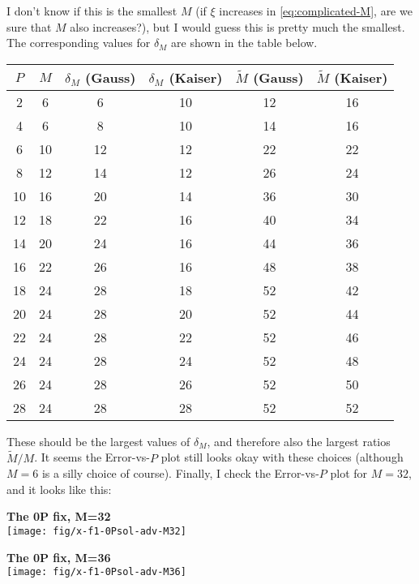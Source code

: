 \documentclass[a4paper,10pt]{article}
\begin{document}
I don't know if this is the smallest $M$ (if $\xi$ increases in
\eqref{eq:complicated-M}, are we sure that $M$ also increases?),
but I would guess this is pretty much the smallest. The
corresponding values for $\delta_M$ are shown in the table below.
\begin{center}
  \begin{tabular}{cccccc}
    \toprule
    $P$ & $M$ & $\delta_M$ (Gauss) & $\delta_M$ (Kaiser) & $\tilde{M}$
    (Gauss) & $\tilde{M}$ (Kaiser) \\
    \midrule
     2 &  6 &  6 & 10 & 12 & 16 \\
     4 &  6 &  8 & 10 & 14 & 16 \\
     6 & 10 & 12 & 12 & 22 & 22 \\
     8 & 12 & 14 & 12 & 26 & 24 \\
    10 & 16 & 20 & 14 & 36 & 30 \\
    12 & 18 & 22 & 16 & 40 & 34 \\
    14 & 20 & 24 & 16 & 44 & 36 \\
    16 & 22 & 26 & 16 & 48 & 38 \\
    18 & 24 & 28 & 18 & 52 & 42 \\
    20 & 24 & 28 & 20 & 52 & 44 \\
    22 & 24 & 28 & 22 & 52 & 46 \\
    24 & 24 & 28 & 24 & 52 & 48 \\
    26 & 24 & 28 & 26 & 52 & 50 \\
    28 & 24 & 28 & 28 & 52 & 52 \\
    \bottomrule
  \end{tabular}
\end{center}
These should be the largest values of $\delta_M$, and therefore
also the largest ratios $\tilde{M}/M$. It seems the Error-vs-$P$
plot still looks okay with these choices (although $M=6$ is a
silly choice of course). Finally, I check the Error-vs-$P$ plot
for $M=32$, and it looks like this:\\[\baselineskip]
\begin{minipage}{0.5\textwidth}\centering
  \textbf{The 0P fix, M=32}\\
  \texttt{[image: fig/x-f1-0Psol-adv-M32]}
\end{minipage}%
\begin{minipage}{0.5\textwidth}\centering
  \textbf{The 0P fix, M=36}\\
  \texttt{[image: fig/x-f1-0Psol-adv-M36]}
\end{minipage}
\end{document}
